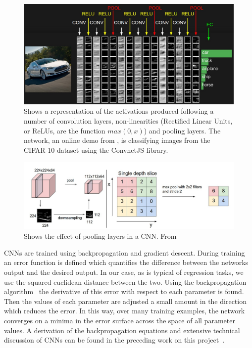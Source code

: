 \documentclass[11pt]{article} %
\begin{document}
\begin{figure}
\includegraphics*[width=1\linewidth,clip]{convnet}
\caption{Shows a representation of the activations produced following a number of convolution layers, non-linearities (Rectified Linear Units, or ReLUs, are the function $max(0,x)$) and pooling layers. The network, an online demo from \cite{KarLects}, is classifying images from the CIFAR-10 dataset using the ConvnetJS library\protect\footnotemark.  \label{fig:convnet}  }
\end{figure}

\begin{figure}
\includegraphics*[width=1\linewidth,clip]{pooling}
\caption{Shows the effect of pooling layers in a CNN.  From~\cite{KarLects} \label{fig:pool}  } 
\end{figure}

CNNs are trained using backpropagation and gradient descent. During training an error function is defined which quantifies the difference between the networks output and the desired output. In our case, as is typical of regression tasks, we use the squared euclidean distance between the two. Using the backpropagation algorithm~\cite{Rumelhart1986} the derivative of this error with respect to each parameter is found.  Then the values of each parameter are adjusted a small amount in the direction which reduces the error. In this way, over many training examples, the network converges on a minima in the error surface across the space of all parameter values.  A derivation of the backpropagation equations and extensive technical discussion of CNNs can be found in the preceding work on this project~\cite{Crabbe2015}.
\end{document}
